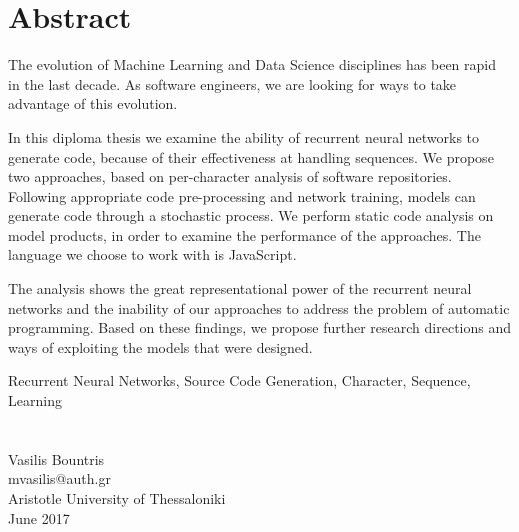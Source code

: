 \begin{abstracteng}

\section*{Abstract}
The evolution of Machine Learning and Data Science disciplines has been rapid in the last decade.
As software engineers, we are looking for ways to take advantage of this evolution.

In this diploma thesis we examine the ability of recurrent neural networks to generate code, because of their effectiveness at handling sequences.
We propose two approaches, based on per-character analysis of software repositories. 
Following appropriate code pre-processing and network training, models can generate code through a stochastic process.
We perform static code analysis on model products, in order to examine the performance of the approaches.
The language we choose to work with is JavaScript.

The analysis shows the great representational power of the recurrent neural networks and the inability of our approaches to address the problem of automatic programming. Based on these findings, we propose further research directions and ways of exploiting the models that were designed.


   \begin{keywordseng}
    Recurrent Neural Networks, Source Code Generation, Character, Sequence, Learning
   \end{keywordseng}
\section*{}
\noindent
Vasilis Bountris\\
mvasilis@auth.gr\\
Aristotle University of Thessaloniki\\
June 2017

\end{abstracteng}